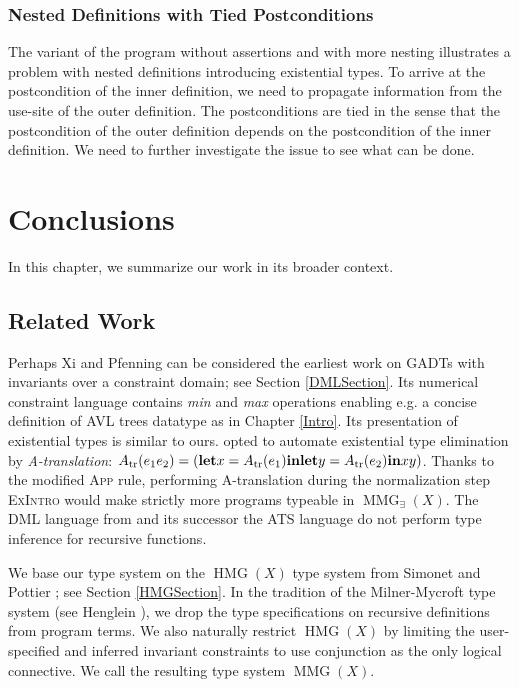 \documentclass{article}
\newcommand{\tmem}[1]{{\em #1\/}}
\newcommand{\tmname}[1]{\textsc{#1}}
\newcommand{\tmop}[1]{\ensuremath{\operatorname{#1}}}
\newcommand{\tmstrong}[1]{\textbf{#1}}
\newcommand{\tmverbatim}[1]{{\ttfamily{#1}}}
\begin{document}
\subsection{Nested Definitions with Tied Postconditions}

The variant of the \tmverbatim{gauss} program without assertions and with more
nesting illustrates a problem with nested definitions introducing existential
types. To arrive at the postcondition of the inner definition, we need to
propagate information from the use-site of the outer definition. The
postconditions are tied in the sense that the postcondition of the outer
definition depends on the postcondition of the inner definition. We need to
further investigate the issue to see what can be done.

\chapter{Conclusions}\label{ChapRelWork}

In this chapter, we summarize our work in its broader context.

\section{Related Work}\label{SecRelWork}

Perhaps Xi and Pfenning {\cite{DML99}} can be considered the earliest work on
GADTs with invariants over a constraint domain; see Section \ref{DMLSection}.
Its numerical constraint language contains {\tmem{min}} and {\tmem{max}}
operations enabling e.g. a concise definition of AVL trees datatype as in
Chapter \ref{Intro}. Its presentation of existential types is similar to ours.
{\cite{DML99}} opted to automate existential type elimination by
{\tmem{A-translation}}: $A_{\tmop{tr}} (e_1 e_2) = \left(
\text{{\tmstrong{let}}} x = A_{\tmop{tr}} (e_1)  \text{{\tmstrong{in}}} 
\text{{\tmstrong{let}}} y = A_{\tmop{tr}} (e_2)  \text{{\tmstrong{in}}} x y
\right)$. Thanks to the modified {\tmname{App}} rule, performing A-translation
during the normalization step {\tmname{ExIntro}} would make strictly more
programs typeable in $\tmop{MMG}_{\exists} (X)$. The DML language from
{\cite{DML99}} and its successor the ATS language do not perform type
inference for recursive functions.

We base our type system on the $\tmop{HMG} (X)$ type system from Simonet and
Pottier {\cite{simonet-pottier-hmg-toplas}}; see Section \ref{HMGSection}. In
the tradition of the Milner-Mycroft type system (see Henglein
{\cite{Henglein93}}), we drop the type specifications on recursive definitions
from program terms. We also naturally restrict $\tmop{HMG} (X)$ by limiting
the user-specified and inferred invariant constraints to use conjunction as
the only logical connective. We call the resulting type system $\tmop{MMG}
(X)$.
\end{document}
